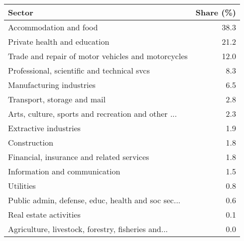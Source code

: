 \begin{tabular}{lr}
\toprule
                                            Sector &  Share (\%) \\
\midrule
                            Accommodation and food &       38.3 \\
                      Private health and education &       21.2 \\
Trade and repair of motor vehicles and motorcycles &       12.0 \\
       Professional, scientific and technical svcs &        8.3 \\
                          Manufacturing industries &        6.5 \\
                       Transport, storage and mail &        2.8 \\
Arts, culture, sports and recreation and other ... &        2.3 \\
                             Extractive industries &        1.9 \\
                                      Construction &        1.8 \\
         Financial, insurance and related services &        1.8 \\
                     Information and communication &        1.5 \\
                                         Utilities &        0.8 \\
Public admin, defense, educ, health and soc sec... &        0.6 \\
                            Real estate activities &        0.1 \\
Agriculture, livestock, forestry, fisheries and... &        0.0 \\
\bottomrule
\end{tabular}
